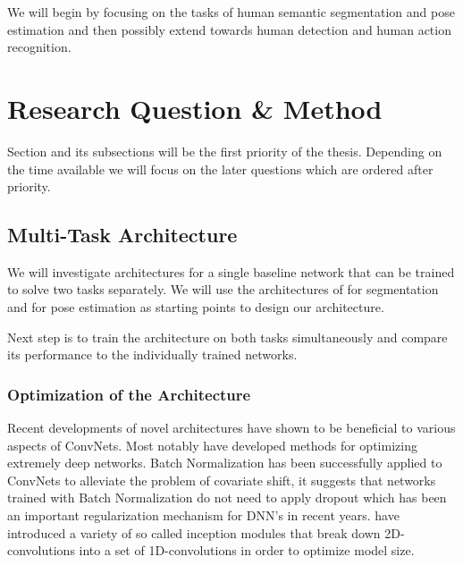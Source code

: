 \documentclass[a4paper,10pt]{article}
\begin{document}
We will begin by focusing on the tasks of human semantic segmentation and pose estimation and then possibly extend towards human detection and human action recognition.






\section{Research Question \& Method}

Section \label{sec:arc:multi} and its subsections will be the first priority of the thesis.  Depending on the time available we will focus on the later questions which are ordered after priority.


\subsection{Multi-Task Architecture}
\label{sec:arc:multi}
We will investigate architectures for a single baseline network that can be trained to solve two tasks separately.  We will use the architectures of \cite{Long2014,Noh2015} for segmentation and \cite{Tompson2015,Wei2016} for pose estimation as starting points to design our architecture.

Next step is to train the architecture on both tasks simultaneously and compare its performance to the individually trained networks.

\subsubsection{Optimization of the Architecture}
\label{sec:arc:optimization}
Recent developments of novel architectures have shown to be beneficial to various aspects of ConvNets.  Most notably \cite{He2015,Srivastava2015} have developed methods for optimizing extremely deep networks.  Batch Normalization \cite{Ioffe2015} has been successfully applied to ConvNets to alleviate the problem of covariate shift, it suggests that networks trained with Batch Normalization do not need to apply dropout \cite{Srivastava2014} which has been an important regularization mechanism for DNN's in recent years.  \cite{Szegedy2014,Szegedy2015} have introduced a variety of so called inception modules that break down 2D-convolutions into a set of 1D-convolutions in order to optimize model size.
\end{document}
